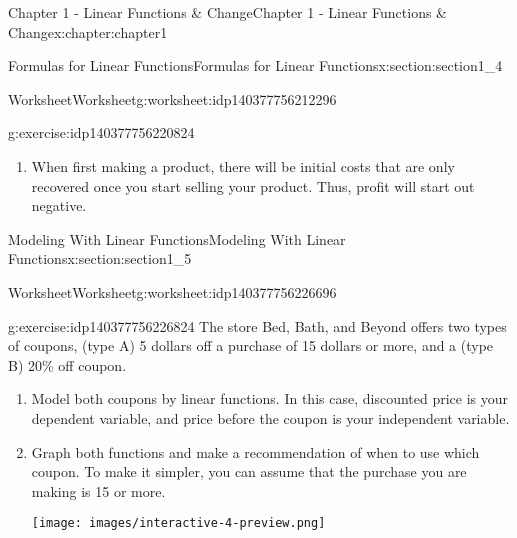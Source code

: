 \documentclass[oneside,10pt,]{book}
\newlength{\qrsize}
\newlength{\previewwidth}
\begin{document}
\begin{chapterptx}{Chapter 1 - Linear Functions \& Change}{}{Chapter 1 - Linear Functions \& Change}{}{}{x:chapter:chapter1}
\begin{sectionptx}{Formulas for Linear Functions}{}{Formulas for Linear Functions}{}{}{x:section:section1_4}
\begin{worksheet-subsection}{Worksheet}{}{Worksheet}{}{}{g:worksheet:idp140377756212296}
\begin{divisionexercise}{3}{}{}{g:exercise:idp140377756220824}
\begin{enumerate}[label=(\alph*)]
\begin{equation*}
y-1 = 1.2(x-5) \quad \Rightarrow \quad y = 1.2x-5 
\end{equation*}
%
\item{}When first making a product, there will be initial costs that are only recovered once you start selling your product. Thus, profit will start out negative.%
\end{enumerate}
\end{divisionexercise}%
\end{worksheet-subsection}
\restoregeometry
\end{sectionptx}
%
%
\typeout{************************************************}
\typeout{************************************************}
%
\begin{sectionptx}{Modeling With Linear Functions}{}{Modeling With Linear Functions}{}{}{x:section:section1_5}
%
%
\typeout{************************************************}
\typeout{************************************************}
%
\begin{worksheet-subsection}{Worksheet}{}{Worksheet}{}{}{g:worksheet:idp140377756226696}
\begin{divisionexercise}{1}{}{}{g:exercise:idp140377756226824}%
The store Bed, Bath, and Beyond offers two types of coupons, (type A) \textdollar{}5 dollars off a purchase of \textdollar{}15 dollars or more, and a (type B) 20\% off coupon. %
\begin{enumerate}[label=(\alph*)]
\item{}Model both coupons by linear functions. In this case, discounted price is your dependent variable, and price before the coupon is your independent variable.%
\item{}Graph both functions and make a recommendation of when to use which coupon. To make it simpler, you can assume that the purchase you are making is \textdollar{}15 or more.%
\par
\setlength{\qrsize}{9em}
\setlength{\previewwidth}{\linewidth}
\addtolength{\previewwidth}{-\qrsize}
\begin{tcbraster}[raster columns=2, raster column skip=1pt, raster halign=center, raster force size=false, raster left skip=0pt, raster right skip=0pt]%
\begin{tcolorbox}[previewstyle, width=\previewwidth]%
%
{\texttt{[image: images/interactive-4-preview.png]}}%

\end{tcolorbox}
\end{tcbraster}
\end{enumerate}
\end{divisionexercise}
\end{worksheet-subsection}
\end{sectionptx}
\end{chapterptx}
\end{document}
